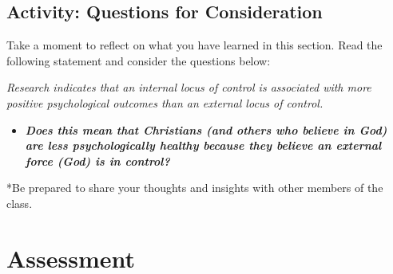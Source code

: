 \documentclass[
]{book}
\providecommand{\tightlist}{%
  \setlength{\itemsep}{0pt}\setlength{\parskip}{0pt}}
\begin{document}
\hypertarget{activity-questions-for-consideration-8}{%
\subsection*{Activity: Questions for Consideration}\label{activity-questions-for-consideration-8}}

\begin{reflect}
Take a moment to reflect on what you have learned in this section. Read the following statement and consider the questions below:

\emph{Research indicates that an internal locus of control is associated with more positive psychological outcomes than an external locus of control.}

\begin{itemize}
\tightlist
\item
  \textbf{\emph{Does this mean that Christians (and others who believe in God) are less psychologically healthy because they believe an external force (God) is in control?}}
\end{itemize}

*Be prepared to share your thoughts and insights with other members of the class.
\end{reflect}

\hypertarget{assessment-4}{%
\section*{Assessment}\label{assessment-4}}
\end{document}
